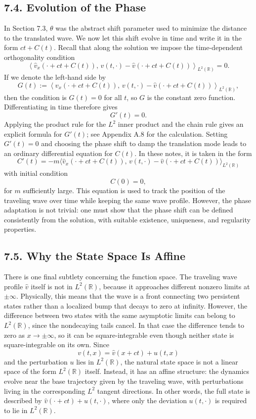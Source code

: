 \documentclass[11pt]{article}
\theoremstyle{definition}
\theoremstyle{remark}
\begin{document}
\subsection*{7.4. Evolution of the Phase}
In Section 7.3, $\theta$ was the abstract shift parameter used to minimize the distance to the translated wave. We now let this shift evolve in time and write it in the form $ct+C(t)$. Recall that along the solution we impose the time-dependent orthogonality condition
\[
\left\langle \hat v_x(\cdot+ct+C(t)),\,v(t,\cdot)-\hat v(\cdot+ct+C(t))\right\rangle_{L^2(\mathbb R)}=0.
\]
If we denote the left-hand side by
\[
G(t):=\left\langle \hat v_x(\cdot+ct+C(t)),\,v(t,\cdot)-\hat v(\cdot+ct+C(t))\right\rangle_{L^2(\mathbb R)},
\]
then the condition is $G(t)=0$ for all $t$, so $G$ is the constant zero function. Differentiating in time therefore gives
\[
G'(t)=0.
\]
Applying the product rule for the $L^2$ inner product and the chain rule gives an explicit formula for $G'(t)$; see Appendix A.8 for the calculation.
Setting $G'(t)=0$ and choosing the phase shift to damp the translation mode leads to an ordinary differential equation for $C(t)$. In these notes, it is taken in the form
\[
C'(t)
=
-m\langle \hat v_x(\cdot+ct+C(t)),\,v(t,\cdot)-\hat v(\cdot+ct+C(t))\rangle_{L^2(\mathbb R)}
\]
with initial condition
\[
C(0)=0,
\]
for $m$ sufficiently large. This equation is used to track the position of the traveling wave over time while keeping the same wave profile. However, the phase adaptation is not trivial: one must show that the phase shift can be defined consistently from the solution, with suitable existence, uniqueness, and regularity properties.

\subsection*{7.5. Why the State Space Is Affine}
There is one final subtlety concerning the function space. The traveling wave profile $\hat v$ itself is not in $L^2(\mathbb R)$, because it approaches different nonzero limits at $\pm\infty$. Physically, this means that the wave is a front connecting two persistent states rather than a localized bump that decays to zero at infinity. However, the difference between two states with the same asymptotic limits can belong to $L^2(\mathbb R)$, since the nondecaying tails cancel. In that case the difference tends to zero as $x\to\pm\infty$, so it can be square-integrable even though neither state is square-integrable on its own. Since
\[
v(t,x)=\hat v(x+ct)+u(t,x)
\]
and the perturbation $u$ lies in $L^2(\mathbb R)$, the natural state space is not a linear space of the form $L^2(\mathbb R)$ itself. Instead, it has an affine structure: the dynamics evolve near the base trajectory given by the traveling wave, with perturbations living in the corresponding $L^2$ tangent directions. In other words, the full state is described by $\hat v(\cdot+ct)+u(t,\cdot)$, where only the deviation $u(t,\cdot)$ is required to lie in $L^2(\mathbb R)$.
\end{document}
